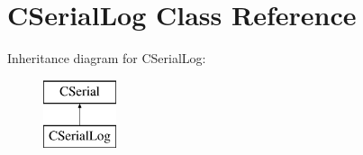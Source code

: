 \hypertarget{classCSerialLog}{\section{C\-Serial\-Log Class Reference}
\label{classCSerialLog}
}
Inheritance diagram for C\-Serial\-Log\-:\begin{figure}[H]
\begin{center}
\leavevmode
\includegraphics[height=2.000000cm]{classCSerialLog}
\end{center}
\end{figure}
